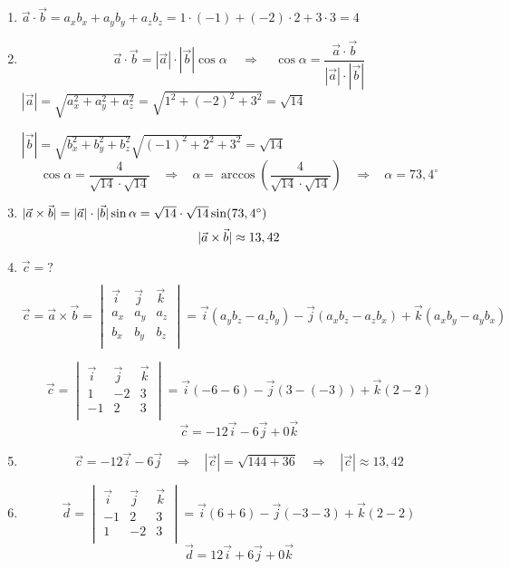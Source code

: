 


\begin{enumerate}[label=\alph*)]
 \item $\vec{a} \cdot \vec{b}=a_xb_x+a_yb_y+a_zb_z=1\cdot(-1)+(-2)\cdot2+3\cdot3=4  $
 \item   $$\vec{a} \cdot \vec{b}=|\vec{a}| \cdot| \vec{b}|\cos\alpha \ \ \ \ \ \Rightarrow  \ \ \ \ \  \cos\alpha=\frac{\vec{a} \cdot \vec{b}}{|\vec{a}| \cdot| \vec{b}|}$$
 $|\vec{a}|=\sqrt{a_x^2+a_y^2+a_z^2}=\sqrt{1^2+(-2)^2+3^2}=\sqrt{14}$
 
 $|\vec{b}|=\sqrt{b_x^2+b_y^2+b_z^2}\sqrt{(-1)^2+2^2+3^2}=\sqrt{14}$
 $$\cos\alpha=\frac{4}{\sqrt{14}\cdot\sqrt{14}} \ \ \ \ \Rightarrow  \ \ \ \  \alpha=\arccos \left( \frac{4}{\sqrt{14} \cdot \sqrt{14}} \right) 
  \ \ \ \ \Rightarrow  \ \ \ \   \alpha=73,4^\circ$$
 
 
 
 \item $\arrowvert \vec{a} \times \vec{b}  \arrowvert =  |\vec{a}| \cdot| \vec{b}|\sin\alpha =\sqrt{14}\cdot\sqrt{14} \sin(73,4^\circ)   $
 $$\arrowvert \vec{a} \times \vec{b}  \arrowvert \approx 13,42$$
 
 
 \item $  \vec{c} =?$
 
 $$\vec{c}=\vec{a} \times \vec{b}=
 \begin{vmatrix}
  \vec{i} & \vec{j} & \vec{k} \\
  a_x  & a_y  & a_z  \\
  b_x  & b_y  & b_z  \\
 \end{vmatrix}
 =\vec{i}(a_yb_z-a_zb_y)-\vec{j}(a_xb_z-a_zb_x) + \vec{k}(a_xb_y-a_yb_x)
 $$
 
 $$\vec{c}=
 \begin{vmatrix}
   \vec{i} & \vec{j} & \vec{k} \\
   1 & -2 & 3 \\
   -1 & 2 & 3 \\
 \end{vmatrix}
 =\vec{i}(-6-6)-\vec{j}(3-(-3))+ \vec{k}(2-2) $$
  $$\vec{c}= -12\vec{i}-6\vec{j} + 0\vec{k}$$
 \item 
 $$\vec{c}= -12\vec{i}-6\vec{j}  \ \ \ \ \Rightarrow  \ \ \ \ |\vec{c}|=\sqrt{144+36} \ \ \ \ \Rightarrow  \ \ \ \ |\vec{c}|\approx13,42 $$
 \item 
 $$\vec{d}=
 \begin{vmatrix}
   \vec{i} & \vec{j} & \vec{k} \\
   -1 & 2 & 3 \\
   1 & -2 & 3 \\
 \end{vmatrix}
 =\vec{i}(6+6)-\vec{j}(-3-3)+ \vec{k}(2-2) $$
  $$\vec{d}= 12\vec{i}+6\vec{j} + 0\vec{k}$$

\end{enumerate}
